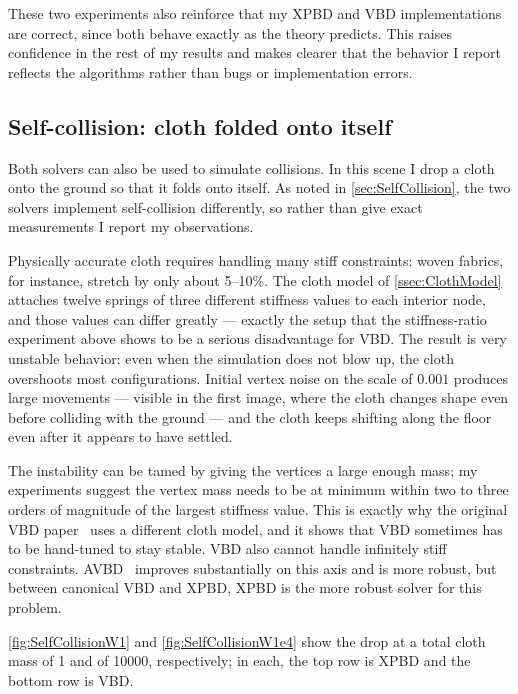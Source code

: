 These two experiments also reinforce that my XPBD and VBD implementations are
correct, since both behave exactly as the theory predicts. This raises confidence
in the rest of my results and makes clearer that the behavior I report reflects
the algorithms rather than bugs or implementation errors.

\subsection{Self-collision: cloth folded onto itself}
\label{ssec:SelfCollisionDrop}

Both solvers can also be used to simulate collisions. In this scene I drop a cloth
onto the ground so that it folds onto itself. As noted in
\autoref{sec:SelfCollision}, the two solvers implement self-collision
differently, so rather than give exact measurements I report my observations.

Physically accurate cloth requires handling many stiff constraints: woven
fabrics, for instance, stretch by only about 5--10\%. The cloth model of
\autoref{ssec:ClothModel} attaches twelve springs of three different stiffness
values to each interior node, and those values can differ greatly --- exactly
the setup that the stiffness-ratio experiment above shows to be a serious
disadvantage for VBD. The result is very unstable behavior:
even when the simulation does not blow up, the cloth overshoots most
configurations. Initial vertex noise on the scale of $0.001$ produces large
movements --- visible in the first image, where the cloth changes shape even
before colliding with the ground --- and the cloth keeps shifting along the floor
even after it appears to have settled.

The instability can be tamed by giving the vertices a large enough mass; my
experiments suggest the vertex mass needs to be at minimum within two to three
orders of magnitude of the largest stiffness value. This is exactly why the
original VBD paper~\cite{Chen2024} uses a different cloth model, and it shows that
VBD sometimes has to be hand-tuned to stay stable. VBD also cannot handle
infinitely stiff constraints. AVBD~\cite{Giles2025} improves substantially on this
axis and is more robust, but between canonical VBD and XPBD, XPBD is the more
robust solver for this problem.

\autoref{fig:SelfCollisionW1} and \autoref{fig:SelfCollisionW1e4} show the drop at
a total cloth mass of 1 and of 10000, respectively; in each, the top row is XPBD
and the bottom row is VBD.

